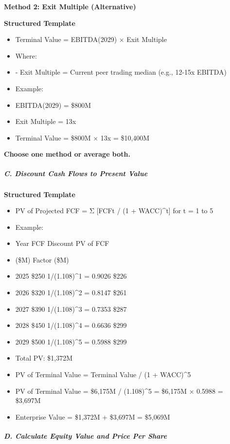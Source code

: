 \documentclass[11pt]{article}
\begin{document}
\textbf{Method 2: Exit Multiple (Alternative)}

\textbf{Structured Template}
\begin{itemize}[leftmargin=*,itemsep=2pt,topsep=2pt]
\item {} Terminal Value = EBITDA(2029) × Exit Multiple
\item {} Where:
\item {} - Exit Multiple = Current peer trading median (e.g., 12-15x EBITDA)
\item {} Example:
\item {} EBITDA(2029) = \$800M
\item {} Exit Multiple = 13x
\item {} Terminal Value = \$800M × 13x = \$10,400M
\end{itemize}

\textbf{Choose one method or average both.}


\subparagraph{C. Discount Cash Flows to Present Value}\mbox{}\par

\textbf{Structured Template}
\begin{itemize}[leftmargin=*,itemsep=2pt,topsep=2pt]
\item {} PV of Projected FCF = Σ [FCFt / (1 + WACC)\textasciicircum{}t] for t = 1 to 5
\item {} Example:
\item {} Year FCF Discount PV of FCF
\item {} (\$M) Factor (\$M)
\item {} 2025 \$250 1/(1.108)\textasciicircum{}1 = 0.9026 \$226
\item {} 2026 \$320 1/(1.108)\textasciicircum{}2 = 0.8147 \$261
\item {} 2027 \$390 1/(1.108)\textasciicircum{}3 = 0.7353 \$287
\item {} 2028 \$450 1/(1.108)\textasciicircum{}4 = 0.6636 \$299
\item {} 2029 \$500 1/(1.108)\textasciicircum{}5 = 0.5988 \$299
\item {} Total PV: \$1,372M
\item {} PV of Terminal Value = Terminal Value / (1 + WACC)\textasciicircum{}5
\item {} PV of Terminal Value = \$6,175M / (1.108)\textasciicircum{}5 = \$6,175M × 0.5988 = \$3,697M
\item {} Enterprise Value = \$1,372M + \$3,697M = \$5,069M
\end{itemize}

\subparagraph{D. Calculate Equity Value and Price Per Share}\mbox{}\par
\end{document}
